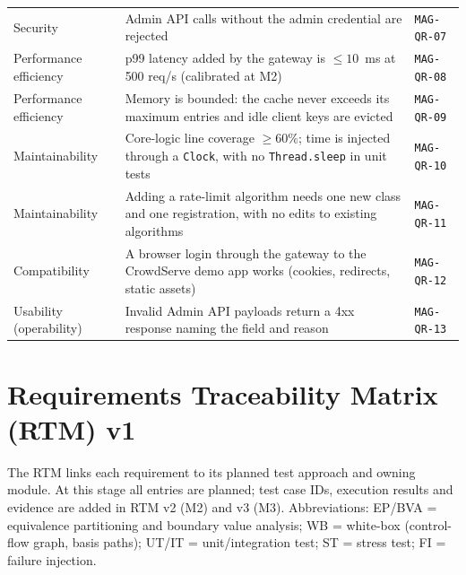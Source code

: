 \documentclass[11pt,a4paper]{article}
\newcommand{\id}[1]{\texttt{#1}}
\begin{document}
\begin{longtable}{L{3.1cm} L{9.6cm} L{1.8cm}}
Security & Admin API calls without the admin credential are rejected & \id{MAG-QR-07} \\
Performance efficiency & p99 latency added by the gateway is $\leq 10$~ms at 500 req/s (calibrated at M2) & \id{MAG-QR-08} \\
Performance efficiency & Memory is bounded: the cache never exceeds its maximum entries and idle client keys are evicted & \id{MAG-QR-09} \\
Maintainability & Core-logic line coverage $\geq 60\%$; time is injected through a \texttt{Clock}, with no \texttt{Thread.sleep} in unit tests & \id{MAG-QR-10} \\
Maintainability & Adding a rate-limit algorithm needs one new class and one registration, with no edits to existing algorithms & \id{MAG-QR-11} \\
Compatibility & A browser login through the gateway to the CrowdServe demo app works (cookies, redirects, static assets) & \id{MAG-QR-12} \\
Usability (operability) & Invalid Admin API payloads return a 4xx response naming the field and reason & \id{MAG-QR-13} \\
\bottomrule
\end{longtable}

\section{Requirements Traceability Matrix (RTM) v1}
The RTM links each requirement to its planned test approach and owning module. At this stage all entries are planned; test case IDs, execution results and evidence are added in RTM v2 (M2) and v3 (M3). Abbreviations: EP/BVA = equivalence partitioning and boundary value analysis; WB = white-box (control-flow graph, basis paths); UT/IT = unit/integration test; ST = stress test; FI = failure injection.
\end{document}
